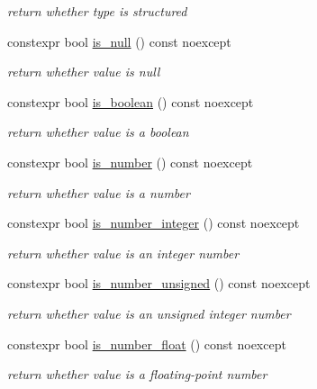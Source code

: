 \begin{DoxyCompactItemize}
\begin{DoxyCompactList}\small\item\em return whether type is structured \end{DoxyCompactList}\item 
constexpr bool \hyperlink{classnlohmann_1_1basic__json_a8faa039ca82427ed29c486ffd00600c3}{is\+\_\+null} () const noexcept
\begin{DoxyCompactList}\small\item\em return whether value is null \end{DoxyCompactList}\item 
constexpr bool \hyperlink{classnlohmann_1_1basic__json_a943e8cb182d0f2365c76d64b42eaa6fd}{is\+\_\+boolean} () const noexcept
\begin{DoxyCompactList}\small\item\em return whether value is a boolean \end{DoxyCompactList}\item 
constexpr bool \hyperlink{classnlohmann_1_1basic__json_a2b9852390abb4b1ef5fac6984e2fc0f3}{is\+\_\+number} () const noexcept
\begin{DoxyCompactList}\small\item\em return whether value is a number \end{DoxyCompactList}\item 
constexpr bool \hyperlink{classnlohmann_1_1basic__json_abac8af76067f1e8fdca9052882c74428}{is\+\_\+number\+\_\+integer} () const noexcept
\begin{DoxyCompactList}\small\item\em return whether value is an integer number \end{DoxyCompactList}\item 
constexpr bool \hyperlink{classnlohmann_1_1basic__json_abc7378cba0613a78b9aad1c8e7044bb0}{is\+\_\+number\+\_\+unsigned} () const noexcept
\begin{DoxyCompactList}\small\item\em return whether value is an unsigned integer number \end{DoxyCompactList}\item 
constexpr bool \hyperlink{classnlohmann_1_1basic__json_a33b4bf898b857c962e798fc7f6e86e70}{is\+\_\+number\+\_\+float} () const noexcept
\begin{DoxyCompactList}\small\item\em return whether value is a floating-\/point number \end{DoxyCompactList}\item 

\end{DoxyCompactItemize}
